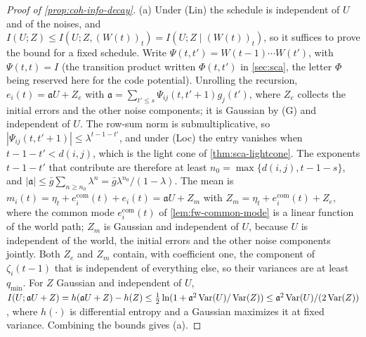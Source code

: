 \begin{proof}[Proof of \cref{prop:coh-info-decay}]
(a) Under (Lin) the schedule is independent of $U$ and of the noises, and $I(U;Z)\le I(U;Z,(W(t))_t)=I(U;Z\mid(W(t))_t)$, so it suffices to prove the bound for a fixed schedule. Write $\Psi(t,t')=W(t-1)\cdots W(t')$, with $\Psi(t,t)=I$ (the transition product written $\Phi(t,t')$ in \cref{sec:sca}, the letter $\Phi$ being reserved here for the code potential). Unrolling the recursion, $e_i(t)=\mathfrak aU+Z_e$ with $\mathfrak a=\sum_{t'\le s}\Psi_{ij}(t,t'+1)g_j(t')$, where $Z_e$ collects the initial errors and the other noise components; it is Gaussian by (G) and independent of $U$. The row-sum norm is submultiplicative, so $|\Psi_{ij}(t,t'+1)|\le\lambda^{t-1-t'}$, and under (Loc) the entry vanishes when $t-1-t'<d(i,j)$, which is the light cone of \cref{thm:sca-lightcone}. The exponents $t-1-t'$ that contribute are therefore at least $n_0=\max\{d(i,j),t-1-s\}$, and $|\mathfrak a|\le\bar g\sum_{n\ge n_0}\lambda^n=\bar g\lambda^{n_0}/(1-\lambda)$. The mean is $m_i(t)=\eta_t+e^{\mathrm{com}}_i(t)+e_i(t)=\mathfrak aU+Z_m$ with $Z_m=\eta_t+e^{\mathrm{com}}_i(t)+Z_e$, where the common mode $e^{\mathrm{com}}_i(t)$ of \cref{lem:fw-common-mode} is a linear function of the world path; $Z_m$ is Gaussian and independent of $U$, because $U$ is independent of the world, the initial errors and the other noise components jointly. Both $Z_e$ and $Z_m$ contain, with coefficient one, the component of $\zeta_i(t-1)$ that is independent of everything else, so their variances are at least $q_{\min}$. For $Z$ Gaussian and independent of $U$, $I(U;\mathfrak aU+Z)=h(\mathfrak aU+Z)-h(Z)\le\frac12\ln(1+\mathfrak a^2\operatorname{Var}(U)/\operatorname{Var}(Z))\le\mathfrak a^2\operatorname{Var}(U)/(2\operatorname{Var}(Z))$, where $h(\cdot)$ is differential entropy and a Gaussian maximizes it at fixed variance. Combining the bounds gives (a).


\end{proof}
